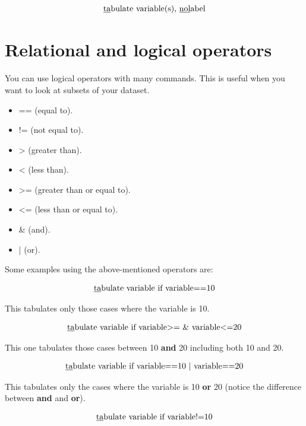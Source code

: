 \documentclass[paper=a4, fontsize=11pt]{scrartcl} %
\numberwithin{equation}{section} %
\numberwithin{figure}{section} %
\numberwithin{table}{section} %
\begin{document}
\begin{align}
\text{\underline{ta}bulate variable(s), \underline{nol}abel}
\end{align}


\section{Relational and logical operators}

You can use logical operators with many commands. This is useful when you want to look at subsets of your dataset.

\begin{itemize}
	\item == (equal to).
	\item != (not equal to).
	\item > (greater than).
	\item < (less than).
	\item >= (greater than or equal to).
	\item <= (less than or equal to).
	\item \& (and).
	\item | (or).
\end{itemize}

Some examples using the above-mentioned operators are:

\begin{align}
\text{\underline{ta}bulate variable if variable==10}
\end{align}

This tabulates only those cases where the variable is 10.

\begin{align}
\text{\underline{ta}bulate variable if variable>= \& variable<=20}
\end{align}

This one tabulates those cases between 10 \textbf{and} 20 including both 10 and 20.

\begin{align}
\text{\underline{ta}bulate variable if variable==10 | variable==20}
\end{align}

This tabulates only the cases where the variable is 10 \textbf{or} 20 (notice the difference between \textbf{and} and \textbf{or}).

\begin{align}
\text{\underline{ta}bulate variable if variable!=10}
\end{align}
\end{document}
